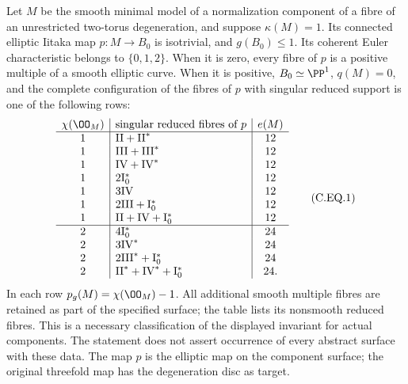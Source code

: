 
\begin{proposition}\label{cdp:st:C.2.UN.33}
Let $M$ be the smooth minimal model of a normalization
component of a fibre of an unrestricted two-torus degeneration,
and suppose $\kappa(M)=1$. Its connected elliptic Iitaka map
$p:M\to B_0$ is isotrivial, and $g(B_0)\le1$.
Its coherent Euler characteristic belongs to $\{0,1,2\}$.
When it is zero, every fibre of $p$ is a positive multiple
of a smooth elliptic curve. When it is positive,
$B_0\simeq\PP^1$, $q(M)=0$, and the complete configuration
of the fibres of $p$ with singular reduced support is one
of the following rows:
\[
\begin{array}{c|l|c}
\chi(\OO_M)&\text{singular reduced fibres of }p&e(M)\\ \hline
1&\mathrm{II}+\mathrm{II}^*&12\\
1&\mathrm{III}+\mathrm{III}^*&12\\
1&\mathrm{IV}+\mathrm{IV}^*&12\\
1&2\mathrm I_0^*&12\\
1&3\mathrm{IV}&12\\
1&2\mathrm{III}+\mathrm I_0^*&12\\
1&\mathrm{II}+\mathrm{IV}+\mathrm I_0^*&12\\ \hline
2&4\mathrm I_0^*&24\\
2&3\mathrm{IV}^*&24\\
2&2\mathrm{III}^*+\mathrm I_0^*&24\\
2&\mathrm{II}^*+\mathrm{IV}^*+\mathrm I_0^*&24 .
\end{array}                                                   \tag{C.EQ.1}\label{cdp:eq:C.EQ.1}
\]
In each row $p_g(M)=\chi(\OO_M)-1$. All additional
smooth multiple fibres are retained as part of the specified
surface; the table lists its nonsmooth reduced fibres.
This is a necessary classification of the displayed
invariant for actual components. The statement does not
assert occurrence of every abstract surface with these data.
The map $p$ is the elliptic map on the component surface;
the original threefold map has the degeneration disc as target.
\end{proposition}

